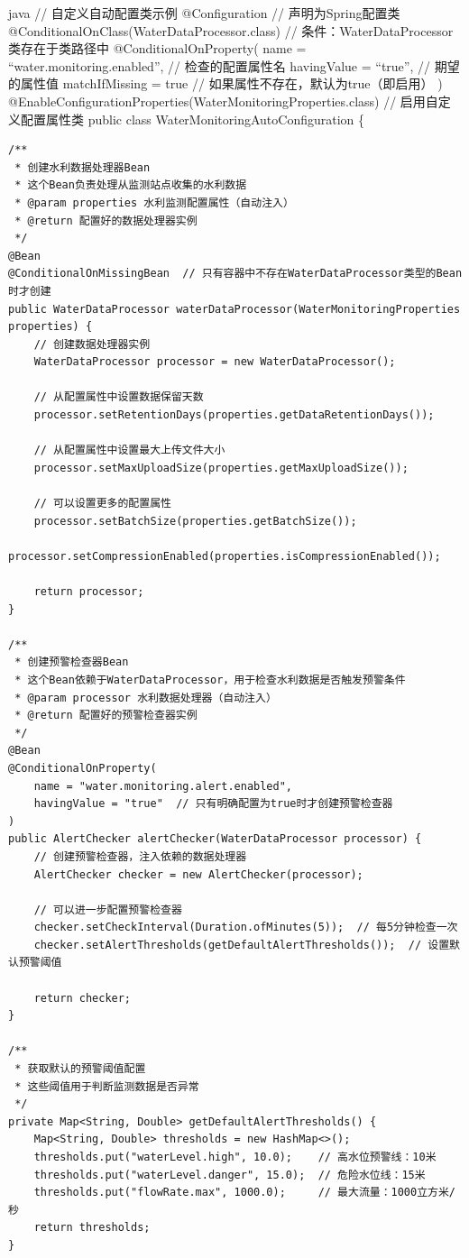 java // 自定义自动配置类示例 @Configuration // 声明为Spring配置类 @ConditionalOnClass(WaterDataProcessor.class) // 条件：WaterDataProcessor类存在于类路径中 @ConditionalOnProperty( name = ``water.monitoring.enabled'', // 检查的配置属性名 havingValue = ``true'', // 期望的属性值 matchIfMissing = true // 如果属性不存在，默认为true（即启用） ) @EnableConfigurationProperties(WaterMonitoringProperties.class) // 启用自定义配置属性类 public class WaterMonitoringAutoConfiguration \{

\begin{verbatim}
/**
 * 创建水利数据处理器Bean
 * 这个Bean负责处理从监测站点收集的水利数据
 * @param properties 水利监测配置属性（自动注入）
 * @return 配置好的数据处理器实例
 */
@Bean
@ConditionalOnMissingBean  // 只有容器中不存在WaterDataProcessor类型的Bean时才创建
public WaterDataProcessor waterDataProcessor(WaterMonitoringProperties properties) {
    // 创建数据处理器实例
    WaterDataProcessor processor = new WaterDataProcessor();
    
    // 从配置属性中设置数据保留天数
    processor.setRetentionDays(properties.getDataRetentionDays());
    
    // 从配置属性中设置最大上传文件大小
    processor.setMaxUploadSize(properties.getMaxUploadSize());
    
    // 可以设置更多的配置属性
    processor.setBatchSize(properties.getBatchSize());
    processor.setCompressionEnabled(properties.isCompressionEnabled());
    
    return processor;
}

/**
 * 创建预警检查器Bean
 * 这个Bean依赖于WaterDataProcessor，用于检查水利数据是否触发预警条件
 * @param processor 水利数据处理器（自动注入）
 * @return 配置好的预警检查器实例
 */
@Bean
@ConditionalOnProperty(
    name = "water.monitoring.alert.enabled", 
    havingValue = "true"  // 只有明确配置为true时才创建预警检查器
)
public AlertChecker alertChecker(WaterDataProcessor processor) {
    // 创建预警检查器，注入依赖的数据处理器
    AlertChecker checker = new AlertChecker(processor);
    
    // 可以进一步配置预警检查器
    checker.setCheckInterval(Duration.ofMinutes(5));  // 每5分钟检查一次
    checker.setAlertThresholds(getDefaultAlertThresholds());  // 设置默认预警阈值
    
    return checker;
}

/**
 * 获取默认的预警阈值配置
 * 这些阈值用于判断监测数据是否异常
 */
private Map<String, Double> getDefaultAlertThresholds() {
    Map<String, Double> thresholds = new HashMap<>();
    thresholds.put("waterLevel.high", 10.0);    // 高水位预警线：10米
    thresholds.put("waterLevel.danger", 15.0);  // 危险水位线：15米
    thresholds.put("flowRate.max", 1000.0);     // 最大流量：1000立方米/秒
    return thresholds;
}
\end{verbatim}

